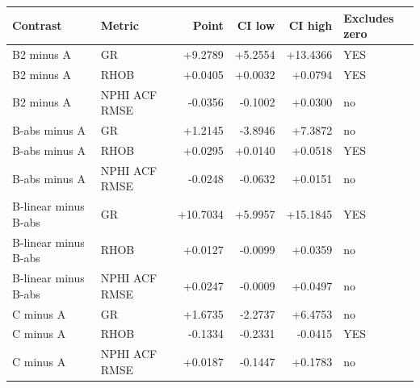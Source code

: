 \begin{tabular}{llrrrl}
\toprule
Contrast & Metric & Point & CI low & CI high & Excludes zero \\
\midrule
B2 minus A & GR & +9.2789 & +5.2554 & +13.4366 & YES \\
B2 minus A & RHOB & +0.0405 & +0.0032 & +0.0794 & YES \\
B2 minus A & NPHI ACF RMSE & -0.0356 & -0.1002 & +0.0300 & no \\
B-abs minus A & GR & +1.2145 & -3.8946 & +7.3872 & no \\
B-abs minus A & RHOB & +0.0295 & +0.0140 & +0.0518 & YES \\
B-abs minus A & NPHI ACF RMSE & -0.0248 & -0.0632 & +0.0151 & no \\
B-linear minus B-abs & GR & +10.7034 & +5.9957 & +15.1845 & YES \\
B-linear minus B-abs & RHOB & +0.0127 & -0.0099 & +0.0359 & no \\
B-linear minus B-abs & NPHI ACF RMSE & +0.0247 & -0.0009 & +0.0497 & no \\
C minus A & GR & +1.6735 & -2.2737 & +6.4753 & no \\
C minus A & RHOB & -0.1334 & -0.2331 & -0.0415 & YES \\
C minus A & NPHI ACF RMSE & +0.0187 & -0.1447 & +0.1783 & no \\
\bottomrule
\end{tabular}
